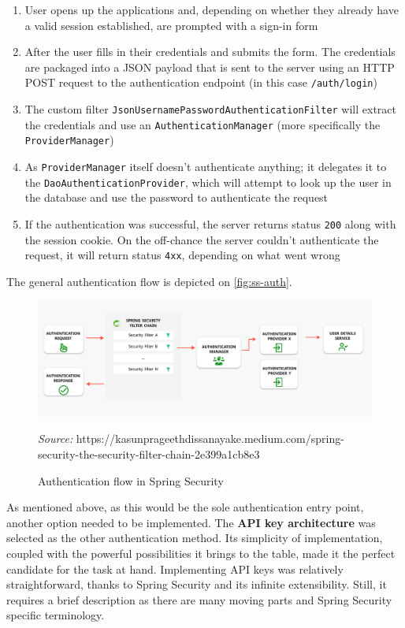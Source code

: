 \documentclass[FM,BP,EN,fonts]{tulthesis}
\begin{document}
\begin{enumerate}
    \item User opens up the applications and, depending on whether they already have a valid session established, are prompted with a sign-in form
    \item After the user fills in their credentials and submits the form. The credentials are packaged into a JSON payload that is sent to the server using an HTTP POST request to the authentication endpoint (in this case \verb|/auth/login|)
    \item The custom filter \verb|JsonUsernamePasswordAuthenticationFilter| will extract the credentials and use an \verb|AuthenticationManager| (more specifically the \verb|ProviderManager|)
    \item As \verb|ProviderManager| itself doesn't authenticate anything; it delegates it to the \verb|DaoAuthenticationProvider|, which will attempt to look up the user in the database and use the password to authenticate the request
    \item If the authentication was successful, the server returns status \verb|200| along with the session cookie. On the off-chance the server couldn't authenticate the request, it will return status \verb|4xx|, depending on what went wrong
\end{enumerate}

The general authentication flow is depicted on \autoref{fig:ss-auth}. 

\begin{figure}[ht]
    \centering
    \includegraphics[scale=.33]{media/spring-security-auth.png}
    \caption{Authentication flow in Spring Security}
    \textit{Source:} https://kasunprageethdissanayake.medium.com/spring-security-the-security-filter-chain-2e399a1cb8e3
    \label{fig:ss-auth}
\end{figure}

As mentioned above, as this would be the sole authentication entry point, another option needed to be implemented. The \textbf{API key architecture} was selected as the other authentication method. Its simplicity of implementation, coupled with the powerful possibilities it brings to the table, made it the perfect candidate for the task at hand. Implementing API keys was relatively straightforward, thanks to Spring Security and its infinite extensibility. Still, it requires a brief description as there are many moving parts and Spring Security specific terminology. 
\end{document}

